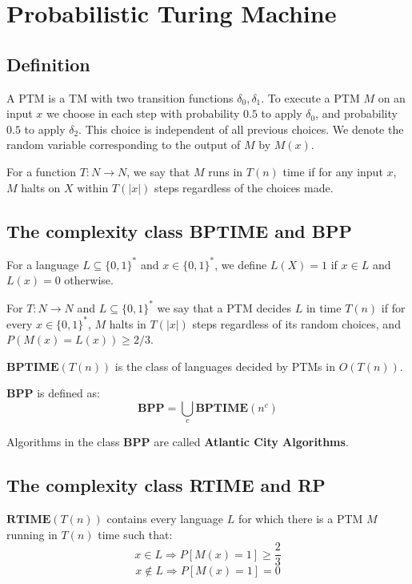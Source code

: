 \documentclass[12pt,letterpaper]{article}
\theoremstyle{definition}
\begin{document}
\section{Probabilistic Turing Machine}

\subsection{Definition}

A PTM is a TM with two transition functions $\delta_0, \delta_1$. To execute a PTM $M$ on an input $x$ we choose in each step with probability $0.5$ to apply $\delta_0$, and probability $0.5$ to apply $\delta_2$. This choice is independent of all previous choices. We denote the random variable corresponding to the output of $M$ by $M(x)$.

For a function $T:N \rightarrow N$, we say that $M$ runs in $T(n)$ time if for any input $x$, $M$ halts on $X$ within $T(|x|)$ steps regardless of the choices made.

\subsection{The complexity class BPTIME and BPP}

For a language $L \subseteq \{0,1\}^*$ and $x \in \{0,1\}^*$, we define $L(X) = 1$ if $x \in L$ and $L(x) = 0$ otherwise.

For $T : N \rightarrow N$ and $L \subseteq \{0,1\}^*$ we say that a PTM decides $L$ in time $T(n)$ if for every $x \in \{0,1\}^*$, $M$ halts in $T(|x|)$ steps regardless of its random choices, and $P(M(x) = L(x)) \geq 2/3$. 

$\mathbf{BPTIME}(T(n))$ is the class of languages decided by PTMs in $O(T(n))$.

$\mathbf{BPP}$ is defined as:
\[\mathbf{BPP} = \bigcup_{c} \mathbf{BPTIME}(n^c)\]

Algorithms in the class $\mathbf{BPP}$ are called \textbf{Atlantic City Algorithms}.

\subsection{The complexity class RTIME and RP}

$\mathbf{RTIME}(T(n))$ contains every language $L$ for which there is a PTM $M$ running in $T(n)$ time such that:
\[x \in L \Rightarrow P[M(x) = 1] \geq \frac{2}{3}\]
\[x \notin L \Rightarrow P[M(x) = 1] = 0\]
\end{document}
